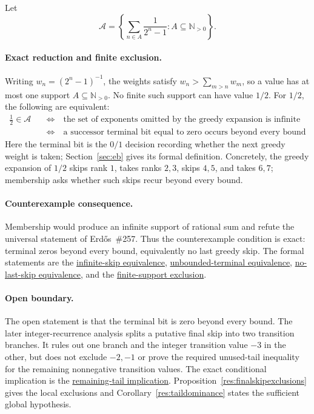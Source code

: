 \documentclass[11pt]{article}
\newcommand{\commit}{ebc98ee71f6819bd9fe344a0bb343542c604e533}
\newcommand{\repobase}{https://github.com/wcook04/plectis-lean-erdos249-257/blob/\commit}
\newcommand{\PK}{Erdos249257}
\newcommand{\lword}[4]{\href{\repobase/\PK/#1\#L#2}{#4}}
\theoremstyle{definition}
\theoremstyle{remark}
\newcommand{\Npos}{\mathbb{N}_{>0}}
\begin{document}
Let
\[
  \mathcal A=\left\{\sum_{n\in A}\frac1{2^n-1}:A\subseteq\Npos\right\}.
\]

\paragraph{Exact reduction and finite exclusion.}
Writing \(w_n=(2^n-1)^{-1}\), the weights satisfy
\(w_n>\sum_{m>n}w_m\), so a value has at most one support
\(A\subseteq\Npos\).  No finite such support can have value \(1/2\).  For
\(1/2\), the following are equivalent:
\[
\begin{aligned}
\frac12\in\mathcal A
&\quad\Longleftrightarrow\quad
\text{the set of exponents omitted by the greedy expansion is infinite}\\
&\quad\Longleftrightarrow\quad
\text{a successor terminal bit equal to zero occurs beyond every bound}
\end{aligned}
\]
Here the terminal bit is the \(0/1\) decision recording whether the next
greedy weight is taken; Section~\ref{sec:eb} gives its formal definition.
Concretely, the greedy expansion of \(1/2\) skips rank \(1\), takes ranks
\(2,3\), skips \(4,5\), and takes \(6,7\); membership asks whether such
skips recur beyond every bound.

\paragraph{Counterexample consequence.}
Membership would produce an infinite support of rational sum and refute the
universal statement of Erd\H{o}s~\#257.  Thus the counterexample condition is
exact: terminal zeros beyond every bound, equivalently no last greedy skip.
The formal statements are the
\lword{GreedyAchievementSet.lean}{2514}{half_mem_mersenneAchievementSet_iff_greedySkippedSupport_infinite}{infinite-skip equivalence},
\lword{HalfCylinderHalfMembershipClassification.lean}{126}{half_mem_mersenneAchievementSet_iff_unboundedTerminalFalse}{unbounded-terminal equivalence},
\lword{HalfCylinderHalfMembershipClassification.lean}{235}{half_mem_mersenneAchievementSet_iff_no_lastHalfGreedySkip}{no-last-skip equivalence},
and the
\lword{HalfCarryReachability.lean}{589}{finite_boolSupport_ne_half}{finite-support exclusion}.

\paragraph{Open boundary.}
The open statement is that the terminal bit is zero beyond every bound.  The
later integer-recurrence analysis splits a putative final skip into two
transition branches.  It rules out one branch and the integer transition value
\(-3\) in the other, but does not exclude \(-2,-1\) or prove the required
unused-tail inequality for the remaining nonnegative transition values.  The exact
conditional implication is the
\lword{HalfCylinderLastProducerContradiction.lean}{387}{half_mem_mersenneAchievementSet_of_middleProducerTailEscapeExceptNegThree}{remaining-tail implication}.
Proposition~\ref{res:finalskipexclusions} gives the local exclusions and
Corollary~\ref{res:taildominance} states the sufficient global hypothesis.
\end{document}
